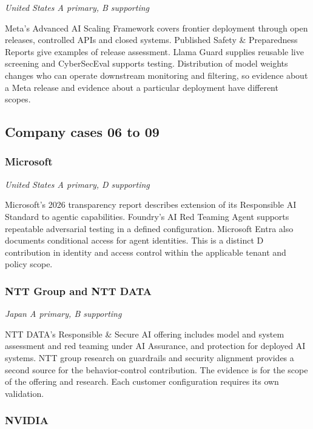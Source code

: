 \textit{United States  \textbullet{}  A primary, B supporting}

Meta's Advanced AI Scaling Framework covers frontier deployment through open releases, controlled APIs and closed systems. Published Safety \& Preparedness Reports give examples of release assessment. Llama Guard supplies reusable live screening and CyberSecEval supports testing. Distribution of model weights changes who can operate downstream monitoring and filtering, so evidence about a Meta release and evidence about a particular deployment have different scopes.~\cite{src35,src36}

\subsection{Company cases 06 to 09}

\subsubsection{Microsoft}

\textit{United States  \textbullet{}  A primary, D supporting}

Microsoft's 2026 transparency report describes extension of its Responsible AI Standard to agentic capabilities. Foundry's AI Red Teaming Agent supports repeatable adversarial testing in a defined configuration. Microsoft Entra also documents conditional access for agent identities. This is a distinct D contribution in identity and access control within the applicable tenant and policy scope.~\cite{src27,src37,src38}

\subsubsection{NTT Group and NTT DATA}

\textit{Japan  \textbullet{}  A primary, B supporting}

NTT DATA's Responsible \& Secure AI offering includes model and system assessment and red teaming under AI Assurance, and protection for deployed AI systems. NTT group research on guardrails and security alignment provides a second source for the behavior-control contribution. The evidence is for the scope of the offering and research. Each customer configuration requires its own validation.~\cite{src39,src40}

\subsubsection{NVIDIA}

